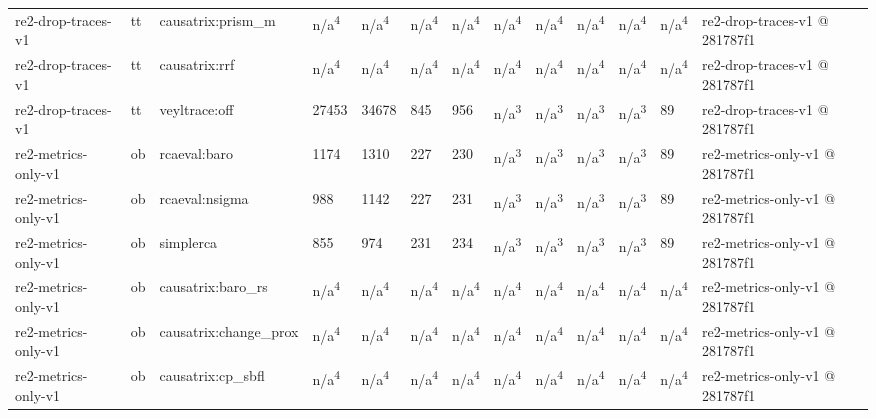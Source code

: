\begin{table}[t]
\begin{tabular}{lllllllllllll}
re2-drop-traces-v1 & tt & causatrix:prism\_m & n/a\textsuperscript{4} & n/a\textsuperscript{4} & n/a\textsuperscript{4} & n/a\textsuperscript{4} & n/a\textsuperscript{4} & n/a\textsuperscript{4} & n/a\textsuperscript{4} & n/a\textsuperscript{4} & n/a\textsuperscript{4} & re2-drop-traces-v1 @ 281787f1 \\
re2-drop-traces-v1 & tt & causatrix:rrf & n/a\textsuperscript{4} & n/a\textsuperscript{4} & n/a\textsuperscript{4} & n/a\textsuperscript{4} & n/a\textsuperscript{4} & n/a\textsuperscript{4} & n/a\textsuperscript{4} & n/a\textsuperscript{4} & n/a\textsuperscript{4} & re2-drop-traces-v1 @ 281787f1 \\
re2-drop-traces-v1 & tt & veyltrace:off & 27453 & 34678 & 845 & 956 & n/a\textsuperscript{3} & n/a\textsuperscript{3} & n/a\textsuperscript{3} & n/a\textsuperscript{3} & 89 & re2-drop-traces-v1 @ 281787f1 \\
re2-metrics-only-v1 & ob & rcaeval:baro & 1174 & 1310 & 227 & 230 & n/a\textsuperscript{3} & n/a\textsuperscript{3} & n/a\textsuperscript{3} & n/a\textsuperscript{3} & 89 & re2-metrics-only-v1 @ 281787f1 \\
re2-metrics-only-v1 & ob & rcaeval:nsigma & 988 & 1142 & 227 & 231 & n/a\textsuperscript{3} & n/a\textsuperscript{3} & n/a\textsuperscript{3} & n/a\textsuperscript{3} & 89 & re2-metrics-only-v1 @ 281787f1 \\
re2-metrics-only-v1 & ob & simplerca & 855 & 974 & 231 & 234 & n/a\textsuperscript{3} & n/a\textsuperscript{3} & n/a\textsuperscript{3} & n/a\textsuperscript{3} & 89 & re2-metrics-only-v1 @ 281787f1 \\
re2-metrics-only-v1 & ob & causatrix:baro\_rs & n/a\textsuperscript{4} & n/a\textsuperscript{4} & n/a\textsuperscript{4} & n/a\textsuperscript{4} & n/a\textsuperscript{4} & n/a\textsuperscript{4} & n/a\textsuperscript{4} & n/a\textsuperscript{4} & n/a\textsuperscript{4} & re2-metrics-only-v1 @ 281787f1 \\
re2-metrics-only-v1 & ob & causatrix:change\_prox & n/a\textsuperscript{4} & n/a\textsuperscript{4} & n/a\textsuperscript{4} & n/a\textsuperscript{4} & n/a\textsuperscript{4} & n/a\textsuperscript{4} & n/a\textsuperscript{4} & n/a\textsuperscript{4} & n/a\textsuperscript{4} & re2-metrics-only-v1 @ 281787f1 \\
re2-metrics-only-v1 & ob & causatrix:cp\_sbfl & n/a\textsuperscript{4} & n/a\textsuperscript{4} & n/a\textsuperscript{4} & n/a\textsuperscript{4} & n/a\textsuperscript{4} & n/a\textsuperscript{4} & n/a\textsuperscript{4} & n/a\textsuperscript{4} & n/a\textsuperscript{4} & re2-metrics-only-v1 @ 281787f1 \\

\end{tabular}
\end{table}
